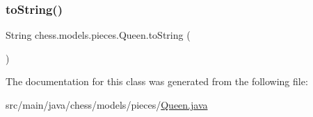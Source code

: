 \subsubsection{\texorpdfstring{to\+String()}{toString()}}
{\footnotesize\ttfamily String chess.\+models.\+pieces.\+Queen.\+to\+String (\begin{DoxyParamCaption}{ }\end{DoxyParamCaption})}



The documentation for this class was generated from the following file\+:\begin{DoxyCompactItemize}
\item 
src/main/java/chess/models/pieces/\mbox{\hyperlink{_queen_8java}{Queen.\+java}}\end{DoxyCompactItemize}
